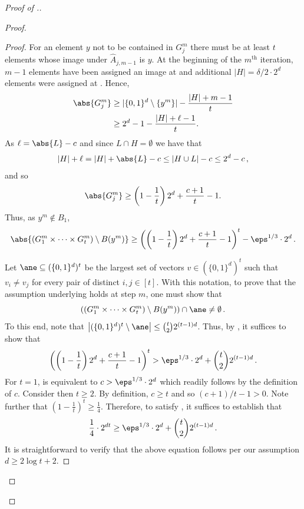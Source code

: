 \begin{proof}[Proof of .]
\begin{proof}
\begin{proof}
For an element $y$ not to be contained in $G^m_j$ there must be at least $t$ elements whose image under $\widehat{A}_{j,m-1}$ is $y$. At the beginning of the $m^{\text{th}}$ iteration, $m-1$ elements have been assigned an image at  and additional 
%
%
$|H| = \delta/2 \cdot 2^d$ 
%
elements were assigned at  . Hence,
\begin{align}\label{eq:gm bound}
\abs{G_j^m} &\geq |\{0,1\}^d \setminus \{ y^m\}| - \frac{|H| + m-1}{t} \notag \\
&\ge 2^d -1 - \frac{|H| + \ell-1}{t}. %
%
\end{align}
As
$\ell = \abs{L} - c$ and since $L \cap H = \emptyset$ we have that
\[
|H|+\ell = |H| + \abs{L} - c \le |H \cup L| - c \le 2^d-c\,,
\]
and so
\[
\abs{G_j^m} \ge \left(1-\frac1{t}\right)2^d +  \frac{c+1}{t} -1.%
\]
Thus, as $y^m \not\in B_1$,
\begin{equation}\label{eq:pool}
\abs{\left(G_1^m \times \cdots \times G_t^m\right) \setminus B(y^m)} \ge \left(\left(1-\frac1{t} \right)2^d +  \frac{c+1}{t} -1\right)^t - \eps^{1/3} \cdot 2^d\,.
\end{equation}
%
%



Let $\ane \subseteq (\{0,1\}^d)^t$ be the largest set of vectors $v \in (\{0,1\}^d)^t$ such that $v_i \neq v_j$ for every pair of distinct $i,j \in [t]$. With this notation, to prove that the assumption underlying   holds at step $m$, one must show that
\begin{equation}\label{eq:eqeqeqqeqeqseger}
\left(\left(G_1^m \times \cdots \times G_t^m \right)\setminus B(y^m)\right)\cap \ane \neq \emptyset\,.
\end{equation}
To this end, note that $\left|(\{0,1\}^d)^t \setminus \ane\right| \le \binom{t}{2} 2^{(t-1)d}$. Thus, by , it suffices to show that
\begin{equation}\label{eq:long one}
\left(\left(1-\frac1{t} \right)2^d +  \frac{c+1}{t} -1\right)^t > \eps^{1/3} \cdot 2^d + \binom{t}{2} 2^{(t-1)d}\,. 
\end{equation}
For $t=1$,  is equivalent to
$
c > \eps^{1/3} \cdot 2^d
$
which readily follows by the definition of $c$. Consider then $t \ge 2$. By definition, $c \ge t$ and so %
%
$(c+1)/t-1 > 0$. 
%
Note further that $\left(1-\frac1{t}\right)^t \ge \frac1{4}$. Therefore, to satisfy , it suffices to establish that
\[
\frac1{4} \cdot 2^{dt} \ge \eps^{1/3} \cdot 2^d + \binom{t}{2} 2^{(t-1)d}\,.
\]
It is straightforward to verify that the above equation follows per our assumption $d \ge 2\log{t} + 2$.
\end{proof}



\end{proof}
\end{proof}
